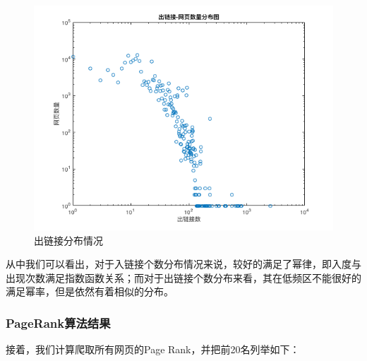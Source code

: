 \documentclass[paper=a4, fontsize=11pt, UTF8]{article} %
\numberwithin{equation}{section} %
\numberwithin{figure}{section} %
\numberwithin{table}{section} %
\begin{document}
\begin{figure}[htp]
\center
\includegraphics[scale=0.5]{out_degree}
\caption{出链接分布情况}
\end{figure}

从中我们可以看出，对于入链接个数分布情况来说，较好的满足了幂律，即入度与出现次数满足指数函数关系；而对于出链接个数分布来看，其在低频区不能很好的满足幂率，但是依然有着相似的分布。

\newpage
\subsubsection{PageRank算法结果}

接着，我们计算爬取所有网页的Page Rank，并把前20名列举如下：
\end{document}
